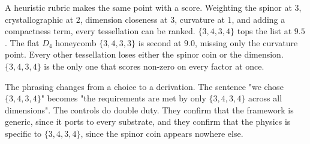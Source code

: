 A heuristic rubric makes the same point with a score. Weighting the spinor at $3$, crystallographic at $2$,
dimension closeness at $3$, curvature at $1$, and adding a compactness term, every tessellation can be ranked.
$\{3,4,3,4\}$ tops the list at $9.5$. The flat $D_4$ honeycomb $\{3,4,3,3\}$ is second at $9.0$, missing only the
curvature point. Every other tessellation loses either the spinor coin or the dimension. $\{3,4,3,4\}$ is the only
one that scores non-zero on every factor at once.


The phrasing changes from a choice to a derivation. The sentence "we chose $\{3,4,3,4\}$" becomes "the
requirements are met by only $\{3,4,3,4\}$ across all dimensions". The controls do double duty. They confirm that
the framework is generic, since it ports to every substrate, and they confirm that the physics is specific to
$\{3,4,3,4\}$, since the spinor coin appears nowhere else.
